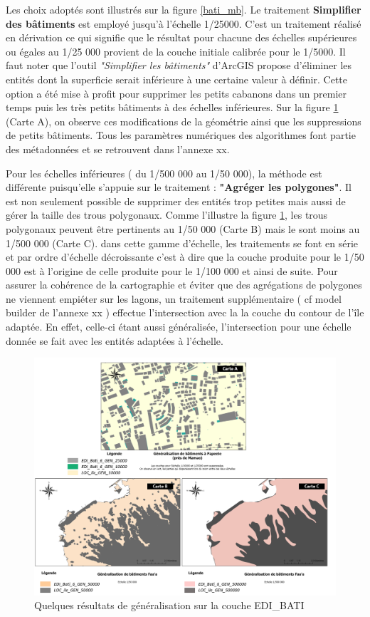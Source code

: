 Les choix adoptés sont illustrés sur la figure \ref{bati_mb}. Le traitement \textbf{ Simplifier des bâtiments} est employé jusqu'à l'échelle 1/25000. C'est un traitement réalisé en dérivation ce qui signifie que le résultat pour chacune des échelles supérieures ou égales au 1/25 000 provient de la couche initiale calibrée pour le 1/5000. Il faut noter que l'outil \textit{"Simplifier les bâtiments"} d'ArcGIS propose d'éliminer les entités dont la superficie serait inférieure à une certaine valeur à définir. Cette option a été mise à profit pour supprimer les petits cabanons dans un premier temps puis les très petits bâtiments à des échelles inférieures. Sur la figure \ref{resultat_bati} (Carte A), on observe ces modifications de la géométrie ainsi que les suppressions de petits bâtiments. Tous les paramètres numériques des algorithmes font partie des métadonnées et se retrouvent dans l'annexe xx.

Pour les échelles inférieures ( du 1/500 000 au 1/50 000), la méthode est différente puisqu'elle s'appuie sur le traitement : \textbf{"Agréger les polygones"}. Il est non seulement possible de supprimer des entités trop petites mais aussi de gérer la taille des trous polygonaux. Comme l'illustre la figure  \ref{resultat_bati}, les trous polygonaux peuvent être pertinents au 1/50 000 (Carte B) mais le sont moins au 1/500 000 (Carte C).
dans cette gamme d'échelle, les traitements se font en série et par ordre d'échelle décroissante c'est à dire que la couche produite pour le 1/50 000 est à l'origine de celle produite pour le 1/100 000 et ainsi de suite. Pour assurer la cohérence de la cartographie et éviter que des agrégations de polygones ne viennent empiéter sur les lagons, un traitement supplémentaire ( cf model builder de l'annexe xx ) effectue l'intersection avec la la couche du contour de l'île adaptée. En effet, celle-ci étant aussi généralisée, l'intersection pour une échelle donnée se fait avec les entités adaptées à l'échelle.


\begin{figure}[ht]
\centering
\includegraphics[width=\linewidth]{images/chap1/resultat_bati_bis.png}
\caption{Quelques résultats de généralisation sur la couche EDI\_BATI}
\label{resultat_bati}
\end{figure}

